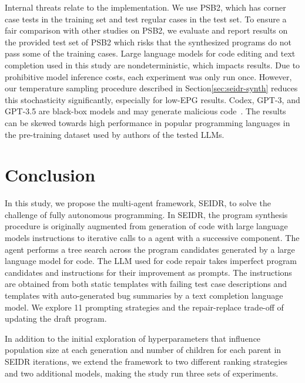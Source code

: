 Internal threats relate to the implementation.
We use PSB2, which has corner case tests in the training set and test regular cases in the test set. 
To ensure a fair comparison with other studies on PSB2, we evaluate and report results on the provided test set of PSB2 which risks that the synthesized programs do not pass some of the training cases. 
Large language models for code editing and text completion used in this study are nondeterministic, which impacts results. 
Due to prohibitive model inference costs, each experiment was only run once.
However, our temperature sampling procedure described in Section\ref{sec:seidr-synth} reduces this stochasticity significantly, especially for low-EPG results.
Codex, GPT-3, and GPT-3.5 are black-box models and may generate malicious code~\cite{pearce2022:asleep}. 
The results can be skewed towards high performance in popular programming languages in the pre-training dataset used by authors of the tested LLMs.

\newpage
\section{Conclusion}
\label{sec:seidr-conclusion}

In this study, we propose the multi-agent framework, SEIDR, to solve the challenge of fully autonomous programming. 
In SEIDR, the program synthesis procedure is originally augmented from generation of code with large language models instructions to iterative calls to a \debug{} agent with a successive \rank{} component. 
The \debug{} agent performs a tree search across the program candidates generated by a large language model for code.
The LLM used for code repair takes imperfect program candidates and instructions for their improvement as prompts. 
The instructions are obtained from both static templates with failing test case descriptions and templates with auto-generated bug summaries by a text completion language model. 
We explore 11 prompting strategies and the repair-replace trade-off of updating the draft program.

In addition to the initial exploration of hyperparameters that influence population size at each generation and number of children for each parent in SEIDR iterations, we extend the framework to two different ranking strategies and two additional models, making the study run three sets of experiments.

